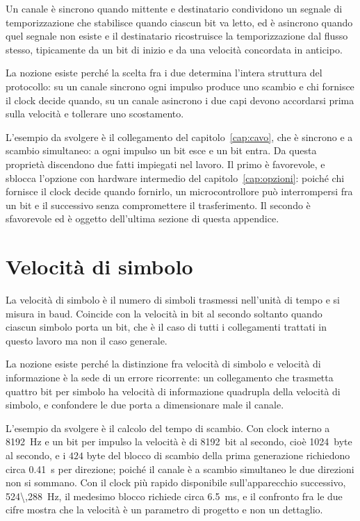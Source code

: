 Un canale è sincrono quando mittente e destinatario condividono un segnale di temporizzazione che stabilisce quando ciascun bit va letto, ed è asincrono quando quel segnale non esiste e il destinatario ricostruisce la temporizzazione dal flusso stesso, tipicamente da un bit di inizio e da una velocità concordata in anticipo.

La nozione esiste perché la scelta fra i due determina l'intera struttura del protocollo: su un canale sincrono ogni impulso produce uno scambio e chi fornisce il clock decide quando, su un canale asincrono i due capi devono accordarsi prima sulla velocità e tollerare uno scostamento.

L'esempio da svolgere è il collegamento del capitolo~\ref{cap:cavo}, che è sincrono e a scambio simultaneo: a ogni impulso un bit esce e un bit entra. Da questa proprietà discendono due fatti impiegati nel lavoro. Il primo è favorevole, e sblocca l'opzione con hardware intermedio del capitolo~\ref{cap:opzioni}: poiché chi fornisce il clock decide quando fornirlo, un microcontrollore può interrompersi fra un bit e il successivo senza compromettere il trasferimento. Il secondo è sfavorevole ed è oggetto dell'ultima sezione di questa appendice.

\section{Velocità di simbolo}

La velocità di simbolo è il numero di simboli trasmessi nell'unità di tempo e si misura in baud. Coincide con la velocità in bit al secondo soltanto quando ciascun simbolo porta un bit, che è il caso di tutti i collegamenti trattati in questo lavoro ma non il caso generale.

La nozione esiste perché la distinzione fra velocità di simbolo e velocità di informazione è la sede di un errore ricorrente: un collegamento che trasmetta quattro bit per simbolo ha velocità di informazione quadrupla della velocità di simbolo, e confondere le due porta a dimensionare male il canale.

L'esempio da svolgere è il calcolo del tempo di scambio. Con clock interno a \SI{8192}{Hz} e un bit per impulso la velocità è di \SI{8192}{bit} al secondo, cioè \SI{1024}{byte} al secondo, e i $424$ byte del blocco di scambio della prima generazione richiedono circa \SI{0,41}{s} per direzione; poiché il canale è a scambio simultaneo le due direzioni non si sommano. Con il clock più rapido disponibile sull'apparecchio successivo, \SI{524\,288}{Hz}, il medesimo blocco richiede circa \SI{6,5}{ms}, e il confronto fra le due cifre mostra che la velocità è un parametro di progetto e non un dettaglio.

